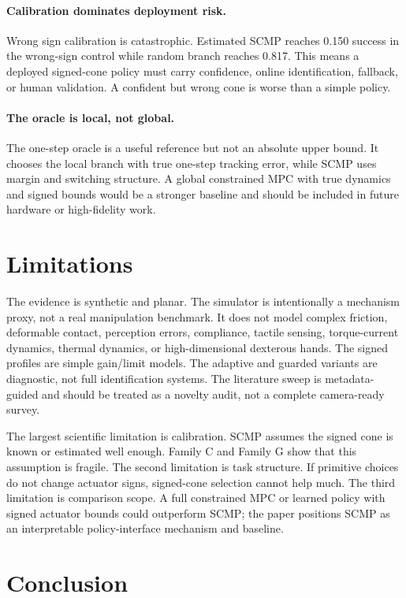 \documentclass{article}
\begin{document}
\paragraph{Calibration dominates deployment risk.}
Wrong sign calibration is catastrophic. Estimated SCMP reaches 0.150 success in the wrong-sign control while random branch reaches 0.817. This means a deployed signed-cone policy must carry confidence, online identification, fallback, or human validation. A confident but wrong cone is worse than a simple policy.

\paragraph{The oracle is local, not global.}
The one-step oracle is a useful reference but not an absolute upper bound. It chooses the local branch with true one-step tracking error, while SCMP uses margin and switching structure. A global constrained MPC with true dynamics and signed bounds would be a stronger baseline and should be included in future hardware or high-fidelity work.

\section{Limitations}

The evidence is synthetic and planar. The simulator is intentionally a mechanism proxy, not a real manipulation benchmark. It does not model complex friction, deformable contact, perception errors, compliance, tactile sensing, torque-current dynamics, thermal dynamics, or high-dimensional dexterous hands. The signed profiles are simple gain/limit models. The adaptive and guarded variants are diagnostic, not full identification systems. The literature sweep is metadata-guided and should be treated as a novelty audit, not a complete camera-ready survey.

The largest scientific limitation is calibration. SCMP assumes the signed cone is known or estimated well enough. Family C and Family G show that this assumption is fragile. The second limitation is task structure. If primitive choices do not change actuator signs, signed-cone selection cannot help much. The third limitation is comparison scope. A full constrained MPC or learned policy with signed actuator bounds could outperform SCMP; the paper positions SCMP as an interpretable policy-interface mechanism and baseline.

\section{Conclusion}
\end{document}
